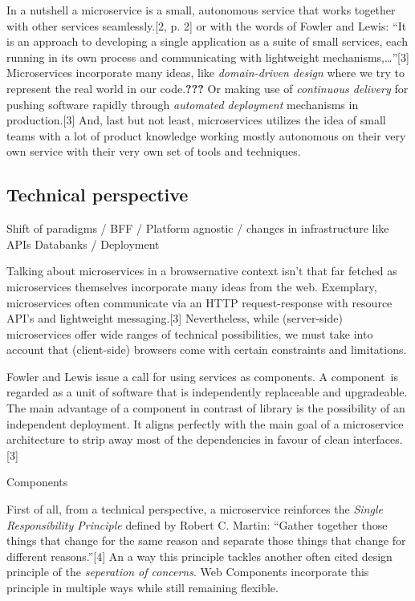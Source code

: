 \documentclass[]{assets/latex/ieee}
\begin{document}
In a nutshell a microservice is a small, autonomous service that works
together with other services seamlessly.{[}2, p. 2{]} or with the words
of Fowler and Lewis: ``It is an approach to developing a single
application as a suite of small services, each running in its own
process and communicating with lightweight mechanisms,\ldots{}''{[}3{]}
Microservices incorporate many ideas, like \emph{domain-driven design}
where we try to represent the real world in our code.{\textbf{???}} Or
making use of \emph{continuous delivery} for pushing software rapidly
through \emph{automated deployment} mechanisms in production.{[}3{]}
And, last but not least, microservices utilizes the idea of small teams
with a lot of product knowledge working mostly autonomous on their very
own service with their very own set of tools and techniques.

\subsection{Technical perspective}\label{technical-perspective}

Shift of paradigms / BFF / Platform agnostic / changes in infrastructure
like APIs Databanks / Deployment

Talking about microservices in a browsernative context isn't that far
fetched as microservices themselves incorporate many ideas from the web.
Exemplary, microservices often communicate via an HTTP request-response
with resource API's and lightweight messaging.{[}3{]} Nevertheless,
while (server-side) microservices offer wide ranges of technical
possibilities, we must take into account that (client-side) browsers
come with certain constraints and limitations.

Fowler and Lewis issue a call for using services as components. A
component~is regarded as a unit of software that is independently
replaceable and upgradeable. The main advantage of a component in
contrast of library is the possibility of an independent deployment. It
aligns perfectly with the main goal of a microservice architecture to
strip away most of the dependencies in favour of clean
interfaces.{[}3{]}

Components

First of all, from a technical perspective, a microservice reinforces
the \emph{Single Responsibility Principle} defined by Robert C. Martin:
``Gather together those things that change for the same reason and
separate those things that change for different reasons.''{[}4{]} An a
way this principle tackles another often cited design principle of the
\emph{seperation of concerns}. Web Components incorporate this principle
in multiple ways while still remaining flexible.
\end{document}
